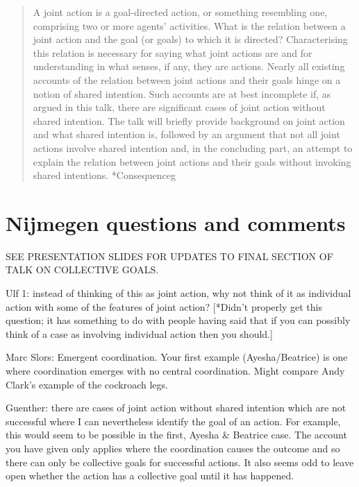 \documentclass[12pt,a4paper]{extarticle}
\begin{document}
\setlength\footnotesep{1em}


\maketitle

\begin{abstract}
A joint action is a goal-directed action, or something resembling one, comprising two or more agents' activities.  What is the relation between a joint action and the goal (or goals) to which it is directed?  Characterising this relation is necessary for saying what joint actions are and for understanding in what senses, if any, they are actions.  Nearly all existing accounts of the relation between joint actions and their goals hinge on a notion of shared intention.  Such accounts are at best incomplete if, as argued in this talk, there are significant cases of joint action without shared intention.  The talk will briefly provide background on joint action and what shared intention is, followed by an argument that not all joint actions involve shared intention and, in the concluding part, an attempt to explain the relation between joint actions and their goals without invoking shared intentions.  
*Consequenceg
\end{abstract}


\section{Nijmegen questions and comments}

SEE PRESENTATION SLIDES FOR UPDATES TO FINAL SECTION OF TALK ON COLLECTIVE GOALS.

Ulf 1: instead of thinking of this as joint action, why not think of it as individual action with some of the features of joint action?  [*Didn't properly get this question; it has something to do with people having said that if you can possibly think of a case as involving individual action then you should.]

Marc Slors: Emergent coordination. Your first example (Ayesha/Beatrice) is one where coordination emerges with no central coordination.  Might compare Andy Clark's example of the cockroach legs.


Guenther: there are cases of joint action without shared intention which are not successful where I can nevertheless identify the goal of an action.  For example, this would seem to be possible in the first, Ayesha \& Beatrice case.  The account you have given only applies where the coordination causes the outcome and so there can only be collective goals for successful actions.  It also seems odd to leave open whether the action has a collective goal until it has happened.
\end{document}
